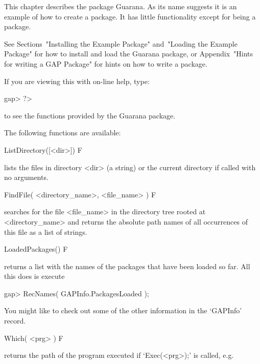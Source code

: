 

This chapter  describes  the  {\GAP}  package  {Guarana}.  As  its  name
suggests it is an example of how to  create  a  {\GAP}  package.  It  has
little functionality except for being a package.

See Sections~"Installing the Example Package"  and~"Loading  the  Example
Package"  for  how  to  install  and  load  the  {Guarana}  package,  or
Appendix~"Hints for writing a GAP Package" for hints on how  to  write  a
{\GAP} package.

If you are viewing this with on-line help, type: 

\beginexample
gap> ?>
\endexample

to see the functions provided by the {Guarana} package.


The following functions are available:

\>ListDirectory([<dir>]) F

lists the files in directory <dir> (a string) or the current directory if
called with no arguments.

\>FindFile( <directory_name>, <file_name> ) F

searches  for the  file   <file_name> in  the  directory  tree  rooted at
<directory_name> and returns the absolute path names of  all  occurrences
of this file as a list of strings.

\>LoadedPackages() F

returns a list with the names of the packages that have  been  loaded  so
far. All this does is execute

\beginexample
gap> RecNames( GAPInfo.PackagesLoaded );
\endexample

You might like to check out some of the other information in the `GAPInfo'
record.

\>Which( <prg> ) F

returns the path of the program executed if `Exec(<prg>);' is called, e.g.

